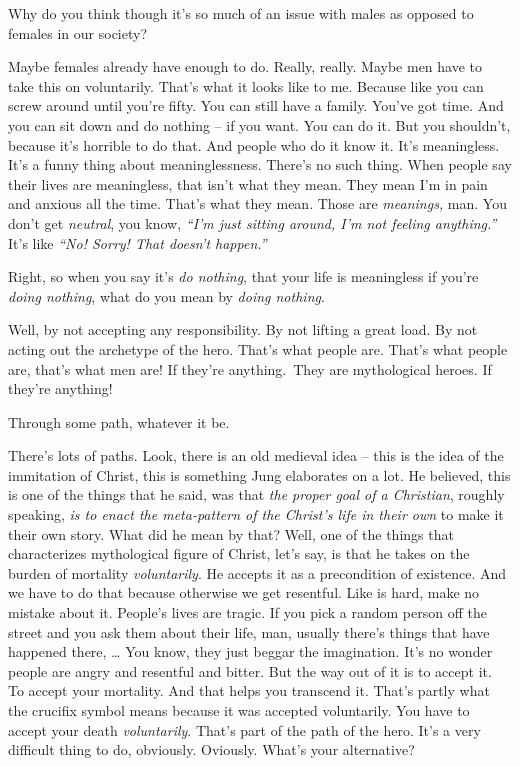 \documentclass{memoir}
\newcommand{\qq}[1]{\emph{“#1”}}
\begin{document}
\begin{drama}
\jrspeaks Why do you think though it’s so much of an issue with males as opposed to females in our society?

\jpspeaks Maybe females already have enough to do.  Really, really. Maybe men have to take this on voluntarily. That's what it looks like to me. Because like you can screw around until you're fifty. You can still have a family. You've got time. And you can sit down and do nothing -- if you want. You can do it. But you shouldn't, because it's horrible to do that. And people who do it know it. It's meaningless. It's a funny thing about meaninglessness. There's no such thing. When people say their lives are meaningless, that isn't what they mean. They mean I'm in pain and anxious all the time. That's what they mean. Those are \emph{meanings,} man. You don't get \emph{neutral}, you know, \qq{I'm just sitting around, I'm not feeling anything.} It's like \qq{No! Sorry! That doesn't happen.}

\jrspeaks Right, so when you say it's \emph{do nothing}, that your life is meaningless if you're \emph{doing nothing}, what do you mean by \emph{doing nothing}.

\jpspeaks Well, by not accepting any responsibility. By not lifting a great load. By not acting out the archetype of the hero. That's what people are. That's what people are, that's what men are! If they're anything. They are mythological heroes. If they're anything!

\jrspeaks Through some path, whatever it be.

		\jpspeaks There's lots of paths. Look, there is an old medieval idea -- this is the idea of the immitation of Christ, this is something Jung elaborates on a lot. He believed, this is one of the things that he said, was that \emph{the proper goal of a Christian}, roughly speaking, \emph{is to enact the meta-pattern of the Christ's life in their own} to make it their own story. What did he mean by that? Well, one of the things that characterizes mythological figure of Christ, let's say, is that he takes on the burden of mortality \emph{voluntarily}. He accepts it as a precondition of existence. And we have to do that because otherwise we get resentful. Like is hard, make no mistake about it. People's lives are tragic. If you pick a random person off the street and you ask them about their life, man, usually there's things that have happened there, \ldots{} You know, they just beggar the imagination. It's no wonder people are angry and resentful and bitter. But the way out of it is to accept it. To accept your mortality. And that helps you transcend it. That's partly what the crucifix symbol means because it was accepted voluntarily. You have to accept your death \emph{voluntarily}. That's part of the path of the hero. It's a very difficult thing to do, obviously. Oviously. What's your alternative?


\end{drama}
\end{document}
